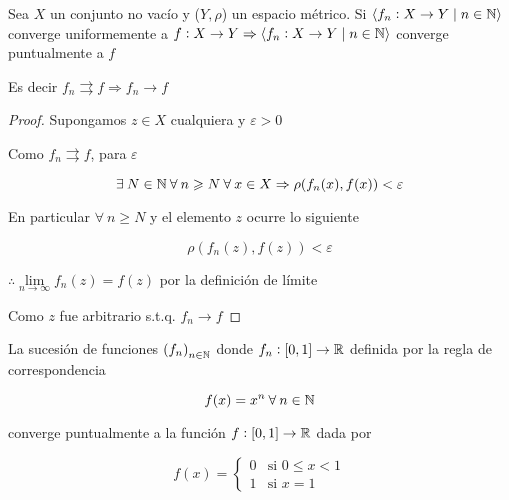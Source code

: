 \begin{lemma} \label{lema512}
    Sea $X$ un conjunto no vacío y ($Y,\rho$) un espacio métrico. Si $ \langle f_n : X \to Y \mid n \in \mathbb{N} \rangle$ converge uniformemente a $f : X \to Y \Rightarrow  \langle f_n : X \to Y \mid n \in \mathbb{N} \rangle$ converge puntualmente a $f$

    Es decir $f_n \rightrightarrows f \Rightarrow f_n \rightarrow f$
\end{lemma}

\begin{proof}
    Supongamos $z \in X$ cualquiera y $\varepsilon > 0$

    Como $f_n \rightrightarrows f$, para $\varepsilon$

    $$ \exists \: N \in \mathbb{N} \: \forall \: n \geqslant N \: \forall \: x \in X \Rightarrow \rho(f_n(x),f(x)) < \varepsilon$$

    En particular $\forall \: n \geqslant N$ y el elemento $z$ ocurre lo siguiente

    $$\rho(f_n(z),f(z)) < \varepsilon$$

    $\therefore \lim\limits_{n \to \infty} f_n(z) = f(z)$ por la definición de límite

    Como $z$ fue arbitrario s.t.q. $f_n \rightarrow f$
\end{proof}

\begin{eg} \label{eg511}
    La sucesión de funciones ${\left(f_n\right)}_{n \in \mathbb{N}}$ donde $f_n : [0,1] \to \mathbb{R}$ definida por la regla de correspondencia 

    $$f(x) = x^n \: \forall \: n \in \mathbb{N}$$

    converge puntualmente a la función $f : [0,1] \to \mathbb{R}$ dada por

    $$ f(x) = \begin{cases}
              0 & \text{si }  0 \leqslant x < 1\\
              1 & \text{si } x = 1
     \end{cases}$$
\end{eg}


